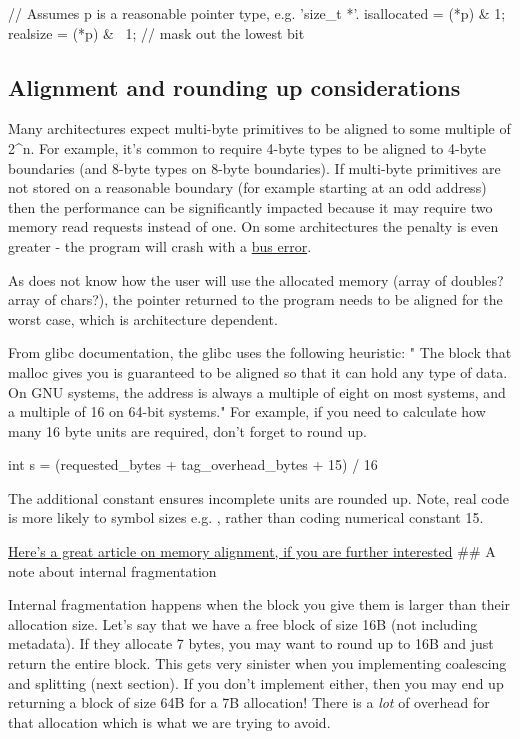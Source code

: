 \begin{code}[language=C]
// Assumes p is a reasonable pointer type, e.g. 'size_t *'.
isallocated = (*p) & 1;
realsize = (*p) & ~1;  // mask out the lowest bit
\end{code}

\subsection{Alignment and rounding up considerations}

Many architectures expect multi-byte primitives to be aligned to some multiple of 2\^{}n. For example, it's common to require 4-byte types to be aligned to 4-byte boundaries (and 8-byte types on 8-byte boundaries). If multi-byte primitives are not stored on a reasonable boundary (for example starting at an odd address) then the performance can be significantly impacted because it may require two memory read requests instead of one. On some architectures the penalty is even greater - the program will crash with a \href{http://en.wikipedia.org/wiki/Bus_error\#Unaligned_access}{bus error}.

As  does not know how the user will use the allocated memory (array of doubles? array of chars?), the pointer returned to the program needs to be aligned for the worst case, which is architecture dependent.

From glibc documentation, the glibc  uses the following heuristic: " The block that malloc gives you is guaranteed to be aligned so that it can hold any type of data. On GNU systems, the address is always a multiple of eight on most systems, and a multiple of 16 on 64-bit systems." For example, if you need to calculate how many 16 byte units are required, don't forget to round up.

\begin{code}[language=C]
int s = (requested_bytes + tag_overhead_bytes + 15) / 16
\end{code}

The additional constant ensures incomplete units are rounded up. Note, real code is more likely to symbol sizes e.g. , rather than coding numerical constant 15.

\href{http://www.ibm.com/developerworks/library/pa-dalign/}{Here's a great article on memory alignment, if you are further interested} \#\# A note about internal fragmentation

Internal fragmentation happens when the block you give them is larger than their allocation size. Let's say that we have a free block of size 16B (not including metadata). If they allocate 7 bytes, you may want to round up to 16B and just return the entire block. This gets very sinister when you implementing coalescing and splitting (next section). If you don't implement either, then you may end up returning a block of size 64B for a 7B allocation! There is a \emph{lot} of overhead for that allocation which is what we are trying to avoid.

